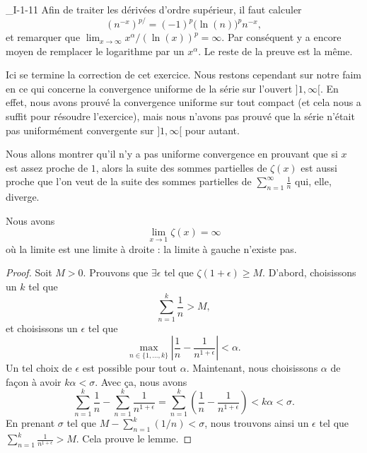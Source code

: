 \begin{corrige}{_I-1-11}
Afin de traiter les dérivées d'ordre supérieur, il faut calculer 
\begin{equation}
	(n^{-x})^{p/}=(-1)^p\big( \ln(n) \big)^p n^{-x},
\end{equation}
et remarquer que $\lim_{x\to\infty} x^{\alpha}/(\ln(x))^p=\infty$. Par conséquent y a encore moyen de remplacer le logarithme par un $x^{\alpha}$. Le reste de la preuve est la même.

Ici se termine la correction de cet exercice. Nous restons cependant sur notre faim en ce qui concerne la convergence uniforme de la série sur l'ouvert $]1,\infty[$. En effet, nous avons prouvé la convergence uniforme sur tout compact (et cela nous a suffit pour résoudre l'exercice), mais nous n'avons pas prouvé que la série n'était pas uniformément convergente sur $]1,\infty[$ pour autant.

Nous allons montrer qu'il n'y a pas uniforme convergence en prouvant que si $x$ est assez proche de $1$, alors la suite des sommes partielles de $\zeta(x)$ est aussi proche que l'on veut de la suite des sommes partielles de $\sum_{n=1}^{\infty}\frac{1}{ n }$ qui, elle, diverge. 

\begin{lemma}
Nous avons
\begin{equation}
	\lim_{x\to 1}\zeta(x)=\infty
\end{equation}
où la limite est une limite à droite : la limite à gauche n'existe pas.
\end{lemma}

\begin{proof}
Soit $M>0$. Prouvons que $\exists\epsilon$ tel que $\zeta(1+\epsilon)\geq M$. D'abord, choisissons un $k$ tel que 
\begin{equation}
	\sum_{n=1}^k\frac{1}{ n }>M,
\end{equation}
et choisissons un $\epsilon$ tel que
\begin{equation}
	\max_{n\in\{ 1,\ldots,k \}}\left|  \frac{1}{ n }-\frac{1}{ n^{1+\epsilon} }\right|<\alpha.
\end{equation}
Un tel choix de $\epsilon$ est possible pour tout $\alpha$. Maintenant, nous choisissons $\alpha$ de façon à avoir $k\alpha<\sigma$. Avec ça, nous avons
\begin{equation}
	\sum_{n=1}^k\frac{1}{ n }-\sum_{n=1}^k\frac{1}{ n^{1+\epsilon} }=\sum_{n=1}^k\left( \frac{1}{ n }-\frac{1}{ n^{1+\epsilon} } \right)<k\alpha<\sigma.
\end{equation}
En prenant $\sigma$ tel que $M-\sum_{n=1}^k(1/n)<\sigma$, nous trouvons ainsi un $\epsilon$ tel que $\sum_{n=1}^k\frac{1}{ n^{1+\epsilon} }>M$. Cela prouve le lemme.
\end{proof}


\end{corrige}
